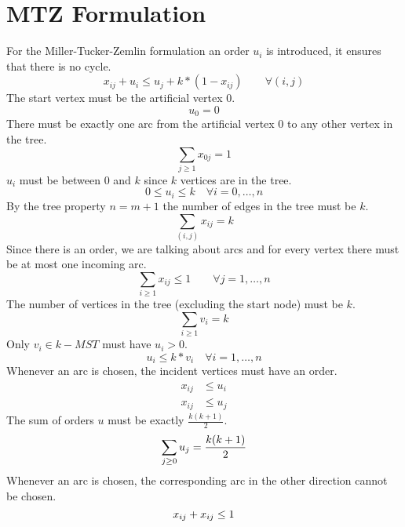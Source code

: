 \documentclass[a4paper]{article}
\numberwithin{equation}{section}
\begin{document}
\section{MTZ Formulation}
For the Miller-Tucker-Zemlin formulation an order $u_i$ is introduced, it ensures that there is no cycle.
\begin{equation}
x_{ij} + u_i \leq u_j + k*(1-x_{ij}) \qquad \forall (i,j)
\end{equation}
The start vertex must be the artificial vertex $0$.
\begin{equation}
	u_0=0
\end{equation}
There must be exactly one arc from the artificial vertex $0$ to any other vertex in the tree.
\begin{equation}
	\sum_{j\geq1} x_{0j} = 1
\end{equation}
$u_i$ must be between $0$ and $k$ since $k$ vertices are in the tree.
\begin{equation}
0\leq u_i \leq k \quad \forall i=0,\dots,n
\end{equation}
By the tree property $n=m+1$ the number of edges in the tree must be $k$.
\begin{equation}
	\sum_{(i,j)} x_{ij} = k
\end{equation}
Since there is an order, we are talking about arcs and for every vertex there must be at most one incoming arc.
\begin{equation}
	\sum_{i\geq 1} x_{ij}\leq 1 \qquad \forall j=1,\dots,n
\end{equation}
The number of vertices in the tree (excluding the start node) must be $k$.
\begin{equation}
	\sum_{i\geq 1}v_i=k
\end{equation}
Only $v_i \in k-MST$ must have $u_i>0$.
\begin{equation}
	u_i \leq k*v_i	\quad \forall i=1,\dots,n
\end{equation}
Whenever an arc is chosen, the incident vertices must have an order.
\begin{align}
	x_{ij} &\leq u_i \\
	x_{ij} &\leq u_j 
\end{align}
The sum of orders $u$ must be exactly $\frac{k(k+1)}{2}$.
\begin{equation}
	\sum_{j \geq 0} u_{j}=\frac{k(k+1)}{2} \\
\end{equation}
Whenever an arc is chosen, the corresponding arc in the other direction cannot be chosen.
\begin{equation}
	x_{ij} + x_{ij}\leq 1 \\
\end{equation}
\end{document}
